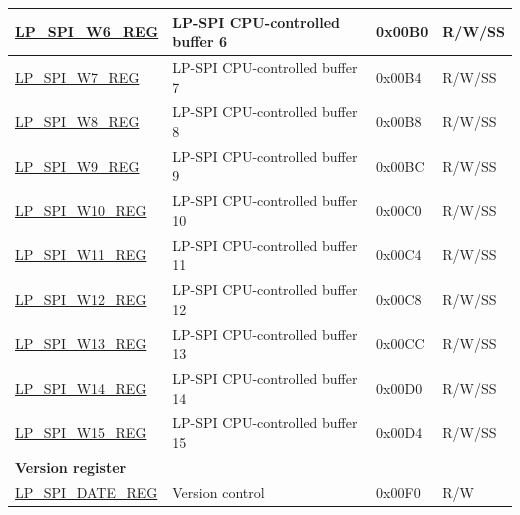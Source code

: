 \begin{longtable}{ | p{6cm} | p{7.2cm} | p{1.3cm} | p{1cm} | }
\hyperref[regdesc:LPSPIW6REG]{LP\_SPI\_W6\_REG} & LP-SPI CPU-controlled buffer 6 & 0x00B0 & R/W/SS \\ \hline
\hyperref[regdesc:LPSPIW7REG]{LP\_SPI\_W7\_REG} & LP-SPI CPU-controlled buffer 7 & 0x00B4 & R/W/SS \\ \hline
\hyperref[regdesc:LPSPIW8REG]{LP\_SPI\_W8\_REG} & LP-SPI CPU-controlled buffer 8 & 0x00B8 & R/W/SS \\ \hline
\hyperref[regdesc:LPSPIW9REG]{LP\_SPI\_W9\_REG} & LP-SPI CPU-controlled buffer 9 & 0x00BC & R/W/SS \\ \hline
\hyperref[regdesc:LPSPIW10REG]{LP\_SPI\_W10\_REG} & LP-SPI CPU-controlled buffer 10 & 0x00C0 & R/W/SS \\ \hline
\hyperref[regdesc:LPSPIW11REG]{LP\_SPI\_W11\_REG} & LP-SPI CPU-controlled buffer 11 & 0x00C4 & R/W/SS \\ \hline
\hyperref[regdesc:LPSPIW12REG]{LP\_SPI\_W12\_REG} & LP-SPI CPU-controlled buffer 12 & 0x00C8 & R/W/SS \\ \hline
\hyperref[regdesc:LPSPIW13REG]{LP\_SPI\_W13\_REG} & LP-SPI CPU-controlled buffer 13 & 0x00CC & R/W/SS \\ \hline
\hyperref[regdesc:LPSPIW14REG]{LP\_SPI\_W14\_REG} & LP-SPI CPU-controlled buffer 14 & 0x00D0 & R/W/SS \\ \hline
\hyperref[regdesc:LPSPIW15REG]{LP\_SPI\_W15\_REG} & LP-SPI CPU-controlled buffer 15 & 0x00D4 & R/W/SS \\ \hline
\multicolumn{4}{|l|}{\textbf{Version register}} \\ \hline
\hyperref[regdesc:LPSPIDATEREG]{LP\_SPI\_DATE\_REG} & Version control & 0x00F0 & R/W \\ \hline
\end{longtable}
